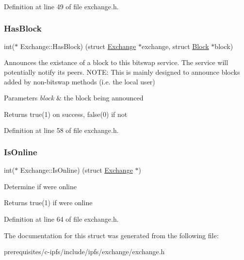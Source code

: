 Definition at line 49 of file exchange.\+h.

\mbox{\label{struct_exchange_a4b8d64028bd091688fbb902ee1f970ca}} 
\subsubsection{\texorpdfstring{Has\+Block}{HasBlock}}
{\footnotesize\ttfamily int($\ast$ Exchange\+::\+Has\+Block) (struct \mbox{\hyperlink{struct_exchange}{Exchange}} $\ast$exchange, struct \mbox{\hyperlink{struct_block}{Block}} $\ast$block)}

Announces the existance of a block to this bitswap service. The service will potentially notify its peers. N\+O\+TE\+: This is mainly designed to announce blocks added by non-\/bitswap methods (i.\+e. the local user) 
\begin{DoxyParams}{Parameters}
{\em block} & the block being announced \\
\hline
\end{DoxyParams}
\begin{DoxyReturn}{Returns}
true(1) on success, false(0) if not 
\end{DoxyReturn}


Definition at line 58 of file exchange.\+h.

\mbox{\label{struct_exchange_aa11261b2f863752b0ef803bcfe2fb5fa}} 
\subsubsection{\texorpdfstring{Is\+Online}{IsOnline}}
{\footnotesize\ttfamily int($\ast$ Exchange\+::\+Is\+Online) (struct \mbox{\hyperlink{struct_exchange}{Exchange}} $\ast$)}

Determine if we\textquotesingle{}re online \begin{DoxyReturn}{Returns}
true(1) if we\textquotesingle{}re online 
\end{DoxyReturn}


Definition at line 64 of file exchange.\+h.



The documentation for this struct was generated from the following file\+:\begin{DoxyCompactItemize}
\item 
prerequisites/c-\/ipfs/include/ipfs/exchange/exchange.\+h\end{DoxyCompactItemize}
